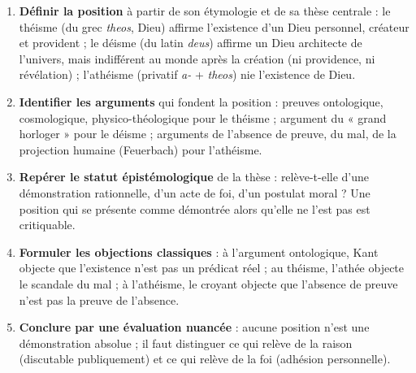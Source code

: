 \documentclass[11pt]{article}
\newcommand{\cle}[1]{{\popxbold\color{popdark}#1}}
\begin{document}
\begin{methode}
\begin{enumerate}
\item \textbf{Définir la position} à partir de son étymologie et de sa thèse centrale : le \cle{théisme} (du grec \emph{theos}, Dieu) affirme l'existence d'un Dieu personnel, créateur et provident ; le \cle{déisme} (du latin \emph{deus}) affirme un Dieu architecte de l'univers, mais indifférent au monde après la création (ni providence, ni révélation) ; l'\cle{athéisme} (privatif \emph{a-} + \emph{theos}) nie l'existence de Dieu.
\item \textbf{Identifier les arguments} qui fondent la position : preuves ontologique, cosmologique, physico-théologique pour le théisme ; argument du « grand horloger » pour le déisme ; arguments de l'absence de preuve, du mal, de la projection humaine (Feuerbach) pour l'athéisme.
\item \textbf{Repérer le statut épistémologique} de la thèse : relève-t-elle d'une démonstration rationnelle, d'un acte de foi, d'un postulat moral ? Une position qui se présente comme démontrée alors qu'elle ne l'est pas est critiquable.
\item \textbf{Formuler les objections classiques} : à l'argument ontologique, Kant objecte que l'existence n'est pas un prédicat réel ; au théisme, l'athée objecte le scandale du mal ; à l'athéisme, le croyant objecte que l'absence de preuve n'est pas la preuve de l'absence.
\item \textbf{Conclure par une évaluation nuancée} : aucune position n'est une démonstration absolue ; il faut distinguer ce qui relève de la raison (discutable publiquement) et ce qui relève de la foi (adhésion personnelle).
\end{enumerate}
\end{methode}
\end{document}
